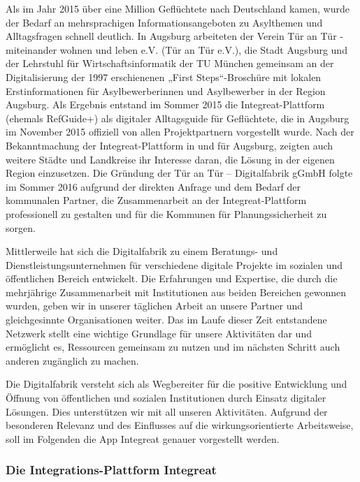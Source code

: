 \documentclass[12pt, a4paper]{article} %
\begin{document}
Als im Jahr 2015 über eine Million Geflüchtete nach Deutschland kamen,
wurde der Bedarf an mehrsprachigen Informationsangeboten zu Asylthemen
und Alltagsfragen schnell deutlich. In Augsburg arbeiteten der Verein
Tür an Tür - miteinander wohnen und leben e.V. (Tür an Tür e.V.), die
Stadt Augsburg und der Lehrstuhl für Wirtschaftsinformatik der TU
München gemeinsam an der Digitalisierung der 1997 erschienenen „First
Steps“-Broschüre mit lokalen Erstinformationen für Asylbewerberinnen und
Asylbewerber in der Region Augsburg. Als Ergebnis entstand im Sommer
2015 die Integreat-Plattform (ehemals RefGuide+) als digitaler
Alltagsguide für Geflüchtete, die in Augsburg im November 2015 offiziell
von allen Projektpartnern vorgestellt wurde. Nach der Bekanntmachung der
Integreat-Plattform in und für Augsburg, zeigten auch weitere Städte und
Landkreise ihr Interesse daran, die Lösung in der eigenen Region
einzusetzen. Die Gründung der Tür an Tür – Digitalfabrik gGmbH folgte im
Sommer 2016 aufgrund der direkten Anfrage und dem Bedarf der kommunalen
Partner, die Zusammenarbeit an der Integreat-Plattform professionell zu
gestalten und für die Kommunen für Planungssicherheit zu sorgen.

Mittlerweile hat sich die Digitalfabrik zu einem Beratungs- und
Dienstleistungsunternehmen für verschiedene digitale Projekte im
sozialen und öffentlichen Bereich entwickelt. Die Erfahrungen und
Expertise, die durch die mehrjährige Zusammenarbeit mit Institutionen
aus beiden Bereichen gewonnen wurden, geben wir in unserer täglichen
Arbeit an unsere Partner und gleichgesinnte Organisationen weiter. Das
im Laufe dieser Zeit entstandene Netzwerk stellt eine wichtige Grundlage
für unsere Aktivitäten dar und ermöglicht es, Ressourcen gemeinsam zu
nutzen und im nächsten Schritt auch anderen zugänglich zu machen.

Die Digitalfabrik versteht sich als Wegbereiter für die positive
Entwicklung und Öffnung von öffentlichen und sozialen Institutionen
durch Einsatz digitaler Lösungen. Dies unterstützen wir mit all unseren
Aktivitäten. Aufgrund der besonderen Relevanz und des Einflusses auf die
wirkungsorientierte Arbeitsweise, soll im Folgenden die App Integreat
genauer vorgestellt werden.

\hypertarget{die-integrations-plattform-integreat}{%
\subsubsection{Die Integrations-Plattform
Integreat}\label{die-integrations-plattform-integreat}}
\end{document}
